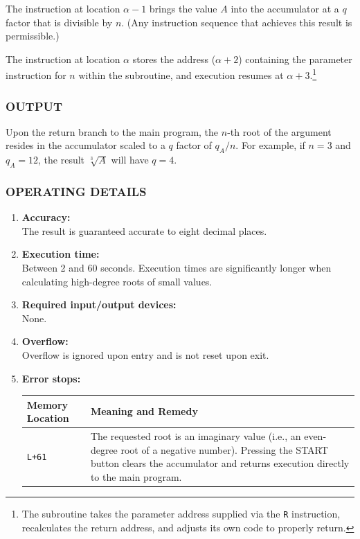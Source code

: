 The instruction at location $\alpha - 1$ brings the value $A$ into the accumulator at a $q$ factor that is divisible by $n$. (Any instruction sequence that achieves this result is permissible.)

The instruction at location $\alpha$ stores the address ($\alpha + 2$) containing the parameter instruction for $n$ within the subroutine, and execution resumes at $\alpha+3$.\footnote{The subroutine takes the parameter address supplied via the \texttt{R} instruction, recalculates the return address, and adjusts its own code to properly return.}

\subsubsection*{OUTPUT}
Upon the return branch to the main program, the $n$-th root of the argument resides in the accumulator scaled to a $q$ factor of $q_A / n$. For example, if $n = 3$ and $q_A = 12$, the result $\sqrt[3]{A}$ will have $q=4$.

\subsubsection*{OPERATING DETAILS}

\begin{enumerate}[leftmargin=1.5em, itemsep=6pt]
    \item \textbf{Accuracy:} \\
    The result is guaranteed accurate to eight decimal places.
    
    \item \textbf{Execution time:} \\
    Between 2 and 60 seconds. Execution times are significantly longer when calculating high-degree roots of small values.
    
    \item \textbf{Required input/output devices:} \\
    None.
    
    \item \textbf{Overflow:} \\
    Overflow is ignored upon entry and is not reset upon exit.
    
    \item \textbf{Error stops:} \\
    \begin{tabularx}{\textwidth}{lX}
        \toprule
        \textbf{Memory Location} & \textbf{Meaning and Remedy} \\
        \midrule
        \texttt{L+61}            & The requested root is an imaginary value (i.e., an even-degree root of a negative number). Pressing the \textsf{START} button clears the accumulator and returns execution directly to the main program. \\
        \bottomrule
    \end{tabularx}
\end{enumerate}
\newpage
